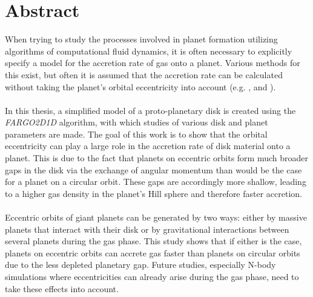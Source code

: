 
\section*{Abstract}
  When trying to study the processes involved in planet formation 
  utilizing algorithms of computational fluid dynamics, it is often necessary 
  to explicitly
  specify a model for the accretion rate of gas onto a planet. 
  Various methods for this exist, but often it is assumed that the accretion 
  rate can be calculated without taking the planet's orbital eccentricity into 
  account
  (e.g. \citeauthor{Ida_2018} \citeyear{Ida_2018}, \citeauthor{Benz_2014} 
  \citeyear{Benz_2014} and \citeauthor{Mordasini_2012} \citeyear{Mordasini_2012}).
  \\
  \\
  In this thesis, a simplified model of a proto-planetary disk is created 
  using the \textit{FARGO2D1D} algorithm, with which studies of various disk 
  and planet parameters are made. The goal of this work is to show that 
  the orbital eccentricity can play a large role in the accretion rate of disk 
  material onto a planet. This is due to the fact that planets on  
  eccentric orbits form much broader gaps in the disk via the exchange of 
  angular momentum than would be the case for a planet on a circular orbit. 
  These gaps are accordingly more shallow, leading to a higher gas density 
  in the planet's Hill sphere and therefore faster accretion. \\
  \\
  Eccentric orbits of giant planets can be generated by two ways: either by 
  massive planets that interact with their disk or by gravitational 
  interactions between several planets during the gas phase. This study shows 
  that if either is the case, planets on eccentric orbits can accrete 
  gas faster than planets on circular orbits due to the less depleted planetary 
  gap. Future studies, especially N-body simulations where eccentricities 
  can already arise during the gas phase, need to take these effects into 
  account.

